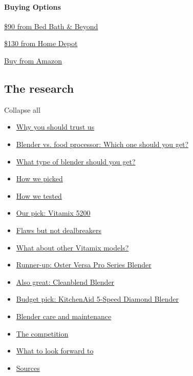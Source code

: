 \hypertarget{buying-options-7}{%
\paragraph{Buying Options}\label{buying-options-7}}

\href{https://shop-links.co/1696305516080111511}{\$90 from Bed Bath \&
Beyond}

\href{https://www.nytimes3xbfgragh.onion/wirecutter/out/link/35968/159787/4/109197?merchant=Home\%20Depot}{\$130
from Home Depot}

\href{https://www.nytimes3xbfgragh.onion/wirecutter/out/link/35968/158229/4/109197?merchant=Amazon}{Buy
from Amazon}

\hypertarget{the-research}{%
\subsection{The research}\label{the-research}}

Collapse all

\begin{itemize}
\tightlist
\item
  \protect\hyperlink{why-you-should-trust-us}{Why you should trust us}
\item
  \protect\hyperlink{blender-vs-food-processor-which-one-should-you-get}{Blender
  vs. food processor: Which one should you get?}
\item
  \protect\hyperlink{what-type-of-blender-should-you-get}{What type of
  blender should you get?}
\item
  \protect\hyperlink{how-we-picked}{How we picked}
\item
  \protect\hyperlink{how-we-tested}{How we tested}
\item
  \protect\hyperlink{our-pick-vitamix-5200}{Our pick: Vitamix 5200}
\item
  \protect\hyperlink{flaws-but-not-dealbreakers}{Flaws but not
  dealbreakers}
\item
  \protect\hyperlink{what-about-other-vitamix-models}{What about other
  Vitamix models?}
\item
  \protect\hyperlink{runner-up-oster-versa-pro-series-blender}{Runner-up:
  Oster Versa Pro Series Blender}
\item
  \protect\hyperlink{also-great-cleanblend-blender}{Also great:
  Cleanblend Blender}
\item
  \protect\hyperlink{budget-pick-kitchenaid-5-speed-diamond-blender}{Budget
  pick: KitchenAid 5-Speed Diamond Blender}
\item
  \protect\hyperlink{blender-care-and-maintenance}{Blender care and
  maintenance}
\item
  \protect\hyperlink{the-competition}{The competition}
\item
  \protect\hyperlink{what-to-look-forward-to}{What to look forward to}
\item
  \protect\hyperlink{sources}{Sources}
\end{itemize}

